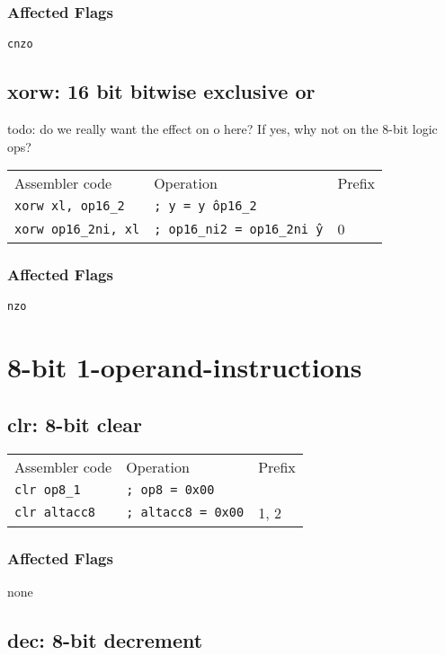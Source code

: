 \documentclass{book}
\begin{document}
\subsubsection*{Affected Flags}

\texttt{cnzo}


\subsection{xorw: 16 bit bitwise exclusive or}

todo: do we really want the effect on o here? If yes, why not on the 8-bit logic ops?

\begin{tabular}{l l l}
Assembler code              & Operation                             & Prefix \\
\texttt{xorw xl, op16\_2}   & \texttt{; y = y \^ op16\_2}           & \\
\texttt{xorw op16\_2ni, xl} & \texttt{; op16\_ni2 = op16\_2ni \^ y} & 0
\end{tabular}

\subsubsection*{Affected Flags}

\texttt{nzo}


\section{8-bit 1-operand-instructions}

\subsection{clr: 8-bit clear}

\begin{tabular}{l l l}
Assembler code       & Operation                 & Prefix \\
\texttt{clr op8\_1}  & \texttt{; op8 = 0x00}     & \\
\texttt{clr altacc8} & \texttt{; altacc8 = 0x00} & 1, 2
\end{tabular}

\subsubsection*{Affected Flags}

none


\subsection{dec: 8-bit decrement}
\end{document}
